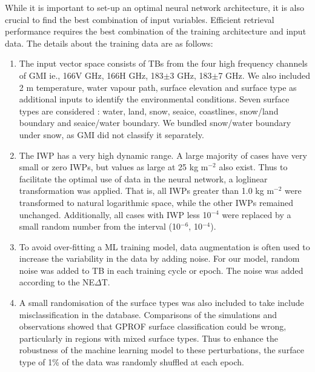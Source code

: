 \documentclass[amt, manuscript]{copernicus}
\begin{document}
While it is important to set-up an optimal neural network architecture, it is also crucial to find the best combination of input variables. Efficient retrieval performance requires the best combination of the training architecture and input data. The details about the training data are as follows: 

\begin{enumerate}
	
	\item The input vector space consists of TBs from the four high frequency channels of GMI ie., 166V\,\,GHz, 166H\,\,GHz, 183$\pm$3\,\,GHz, 183$\pm$7\,\,GHz. We also included 2\,\,m temperature, water vapour path, surface elevation and surface type as additional inputs to identify the environmental conditions. Seven surface types are considered : water, land, snow, seaice, coastlines, snow/land boundary and seaice/water boundary. We bundled snow/water boundary under snow, as GMI did not classify it separately. 
	
	\item The IWP has a very high dynamic range. A large majority of cases have very small or zero IWPs, but values as large at 25\,\,kg m$^{-2}$ also exist. Thus to facilitate the optimal use of data in the neural network, a loglinear transformation was applied. That is, all IWPs greater than 1.0\,\,kg m$^{-2}$  were transformed to natural logarithmic space, while the other IWPs remained unchanged. Additionally, all cases with IWP less 10$^{-4}$ were replaced by a small random number from the interval (10$^{-6}$, 10$^{-4}$).	
	
	\item To avoid over-fitting a ML training model, data augmentation is often used to increase the variability in the data by adding noise. For our model, random noise was added to TB in each training cycle or epoch. The noise was added according to the NE$\Delta$T. 
	
	\item A small randomisation of the surface types was also included to take include misclassification in the database. Comparisons of the simulations and observations showed that GPROF surface classification could be wrong, particularly in regions with mixed surface types. Thus to enhance the robustness of the machine learning model to these perturbations, the surface type of 1\% of the data was randomly shuffled at each epoch. 	
	
\end{enumerate}
\end{document}
